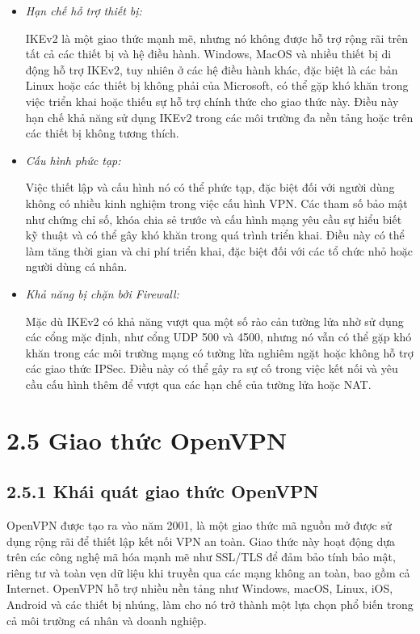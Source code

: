   \begin{itemize}
        \item \textit{Hạn chế hỗ trợ thiết bị:}
        
         IKEv2 là một giao thức mạnh mẽ, nhưng nó không được hỗ trợ rộng rãi trên tất cả các thiết bị và hệ điều hành. Windows, MacOS và nhiều thiết bị di động hỗ trợ IKEv2, tuy nhiên ở các hệ điều hành khác, đặc biệt là các bản Linux hoặc các thiết bị không phải của Microsoft, có thể gặp khó khăn trong việc triển khai hoặc thiếu sự hỗ trợ chính thức cho giao thức này. Điều này hạn chế khả năng sử dụng IKEv2 trong các môi trường đa nền tảng hoặc trên các thiết bị không tương thích.
        \item \textit{Cấu hình phức tạp:}

        Việc thiết lập và cấu hình nó có thể phức tạp, đặc biệt đối với người dùng không có nhiều kinh nghiệm trong việc cấu hình VPN. Các tham số bảo mật như chứng chỉ số, khóa chia sẻ trước và cấu hình mạng yêu cầu sự hiểu biết kỹ thuật và có thể gây khó khăn trong quá trình triển khai. Điều này có thể làm tăng thời gian và chi phí triển khai, đặc biệt đối với các tổ chức nhỏ hoặc người dùng cá nhân.
       
        \item \textit{Khả năng bị chặn bởi Firewall:}

        Mặc dù IKEv2 có khả năng vượt qua một số rào cản tường lửa nhờ sử dụng các cổng mặc định, như cổng UDP 500 và 4500, nhưng nó vẫn có thể gặp khó khăn trong các môi trường mạng có tường lửa nghiêm ngặt hoặc không hỗ trợ các giao thức IPSec. Điều này có thể gây ra sự cố trong việc kết nối và yêu cầu cấu hình thêm để vượt qua các hạn chế của tường lửa hoặc NAT.
    \end{itemize} 
 
 \section*{2.5 Giao thức OpenVPN}

 \subsection*{2.5.1 Khái quát giao thức OpenVPN}

OpenVPN được tạo ra vào năm 2001, là một giao thức mã nguồn mở được sử dụng rộng rãi để thiết lập kết nối VPN an toàn. Giao thức này hoạt động dựa trên các công nghệ mã hóa mạnh mẽ như SSL/TLS để đảm bảo tính bảo mật, riêng tư và toàn vẹn dữ liệu khi truyền qua các mạng không an toàn, bao gồm cả Internet. OpenVPN hỗ trợ nhiều nền tảng như Windows, macOS, Linux, iOS, Android và các thiết bị nhúng, làm cho nó trở thành một lựa chọn phổ biến trong cả môi trường cá nhân và doanh nghiệp.

